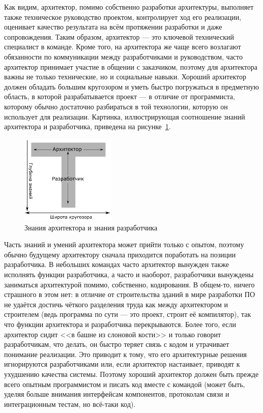 \documentclass{../../text-style}
\begin{document}
Как видим, архитектор, помимо собственно разработки архитектуры, выполняет также техническое руководство проектом, контролирует ход его реализации, оценивает качество результата на всём протяжении разработки и даже сопровождения. Таким образом, архитектор --- это ключевой технический специалист в команде. Кроме того, на архитектора же чаще всего возлагают обязанности по коммуникации между разработчиками и руководством, часто архитектор принимает участие в общении с заказчиком, поэтому для архитектора важны не только технические, но и социальные навыки. Хороший архитектор должен обладать большим кругозором и уметь быстро погружаться в предметную область, в которой разрабатывается проект --- в отличие от программиста, которому обычно достаточно разбираться в той технологии, которую он использует для реализации. Картинка, иллюстрирующая соотношение знаний архитектора и разработчика, приведена на рисунке~\ref{figure:architectVsDeveloper}.

\begin{figure}
    \begin{center}
        \includegraphics[width=0.4\textwidth]{architectVsDeveloper.png}
    \end{center}
    \caption{Знания архитектора и знания разработчика}
    \label{figure:architectVsDeveloper}
\end{figure}

Часть знаний и умений архитектора может прийти только с опытом, поэтому обычно будущему архитектору сначала приходится поработать на позиции разработчика. В небольших командах часто архитектор вынужден также исполнять функции разработчика, а часто и наоборот, разработчики вынуждены заниматься архитектурой помимо, собственно, кодирования. В общем-то, ничего страшного в этом нет: в отличие от строительства зданий в мире разработки ПО не удаётся достичь чёткого разделения труда как между архитектором и строителем (ведь программа по сути --- это проект, строит её компилятор), так что функции архитектора и разработчика перекрываются. Более того, если архитектор сидит <<в башне из слоновой кости>> и только говорит разработчикам, что делать, он быстро теряет связь с кодом и утрачивает понимание реализации. Это приводит к тому, что его архитектурные решения игнорируются разработчиками или, если архитектор настаивает, приводят к ухудшению качества системы. Поэтому хороший архитектор должен быть прежде всего опытным программистом и писать код вместе с командой (может быть, уделяя больше внимания интерфейсам компонентов, протоколам связи и интеграционным тестам, но всё-таки код). 
\end{document}

